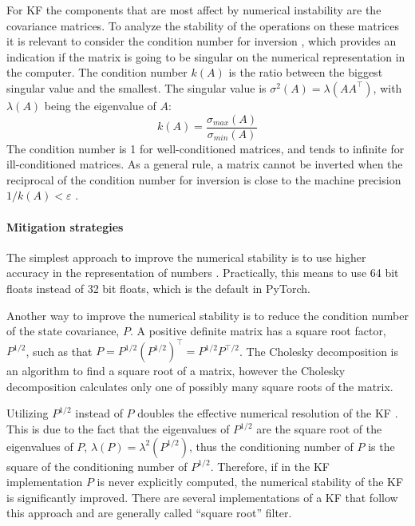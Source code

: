 \documentclass{article}
\begin{document}
For KF the components that are most affect by numerical instability are the covariance matrices. To analyze the stability of the operations on these matrices it is relevant to consider the condition number for inversion \cite{mohinder_s_grewal_kalman_2001, kaminski_discrete_1971}, which provides an indication if the matrix is going to be singular on the numerical representation in the computer. The condition number $k(A)$ is the ratio between the biggest singular value and the smallest. The singular value is $\sigma^2(A) = \lambda(AA^\top)$, with  $\lambda(A)$ being the eigenvalue of $A$:
\begin{equation*}%
    k(A) = \frac{\sigma_{max}(A)}{\sigma_{min}(A)}
\end{equation*}
The condition number is 1 for well-conditioned matrices, and tends to infinite for ill-conditioned matrices. As a general rule,  a matrix cannot be inverted when the reciprocal of the condition number for inversion is close to the machine precision $ 1/k(A) < \varepsilon$ \cite{mohinder_s_grewal_kalman_2001}.

\paragraph{Mitigation strategies}
The simplest approach to improve the numerical stability is to use higher accuracy in the representation of numbers \cite{dan_simon_optimal_2006}. Practically, this means to use 64 bit floats instead of 32 bit floats, which is the default in \textsf{PyTorch}.

Another way to improve the numerical stability is to reduce the condition number of the state covariance, $P$. A positive definite matrix has a square root factor, $P^{1/2}$, such as that $P = P^{1/2}(P^{1/2})^\top=P^{1/2}P^{\top/2}$.
The Cholesky decomposition is an algorithm to find a square root of a matrix, however the Cholesky decomposition calculates only one of possibly many square roots of the matrix.

Utilizing $P^{1/2}$ instead of $P$ doubles the effective numerical resolution of the KF \cite{kaminski_discrete_1971,dan_simon_optimal_2006,rutten_square-root_2013}. This is due to the fact that the eigenvalues of $P^{1/2}$ are the square root of the eigenvalues of $P$, $\lambda(P) = \lambda^2(P^{1/2})$, thus the conditioning number of $P$ is the square of the conditioning number of $P^{1/2}$. Therefore, if in the KF implementation $P$ is never explicitly computed, the numerical stability of the KF is significantly improved.
There are several implementations of a KF that follow this approach \cite{potter_statistical_1963,carlson_fast_1973,bierman_numerical_1977} and are generally called ``square root'' filter.
\end{document}
